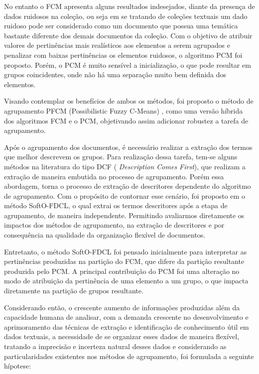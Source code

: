 No entanto o FCM apresenta alguns resultados indesejados, diante da presença de dados ruidosos na
coleção, ou seja em se tratando de coleções textuais um dado ruidoso pode ser considerado como um
documento que possua uma temática bastante diferente dos demais documentos da coleção. Com o
objetivo de atribuir valores de pertinências mais realísticos aos elementos a serem agrupados e
penalizar com baixas pertinências os elementos ruidosos, o algoritmo PCM foi proposto. Porém, o PCM
é muito sensível a inicialização, o que pode resultar em grupos coincidentes, onde não há uma
separação muito bem definida dos elementos.

Visando contemplar os benefícios de ambos os métodos, foi proposto o método de agrupamento PFCM
(Possibilistic Fuzzy C-Means) \cite{Pal2005}, como uma versão híbrida dos algoritmos FCM e o PCM,
objetivando assim adicionar robustez a tarefa de agrupamento.

Após o agrupamento dos documentos, é necessário realizar a extração dos termos que melhor descrevem
os grupos. Para realização dessa tarefa, tem-se alguns métodos na literatura do tipo DCF ({\it
Description Comes First}), que realizam a extração de maneira embutida no processo de agrupamento.
Porém essa abordagem, torna o processo de extração de descritores dependente do algoritmo de
agrupamento. Com o propósito de contornar esse cenário, foi proposto em  o
método SoftO-FDCL, o qual extrai os termos descritores após a etapa de agrupamento, de maneira
independente. Permitindo avaliarmos diretamente os impactos dos métodos de agrupamento, na
extração de descritores e por consequência na qualidade da organização flexível de documentos.

Entretanto, o método SoftO-FDCL foi pensado inicialmente para interpretar as pertinências produzidas
na partição do FCM, que difere da partição resultante produzida pelo PCM. A principal contribuição
do PCM foi uma alteração no modo de atribuição da pertinência de uma elemento a um grupo, o que
impacta diretamente na partição de grupos resultante. 

Considerando então, o crescente aumento de informações produzidas além da capacidade humana de
analisar, com a demanda crescente no desenvolvimento e aprimoramento das técnicas de extração e
identificação de conhecimento útil em dados textuais, a necessidade de se organizar esses dados de
maneira flexível, tratando a imprecisão e incerteza natural desses dados e considerando as
particularidades existentes nos métodos de agrupamento, foi formulada a seguinte hípotese:

